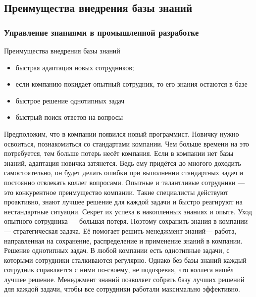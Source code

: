 \documentclass{../industrial-development}
\begin{document}
\subsection{Преимущества внедрения базы знаний}

\begin{frame} \frametitle{Управление знаниями в промышленной разработке}
  \begin{block}{Преимущества внедрения базы знаний}
  \end{block}
  
  \begin{itemize}
  \item быстрая адаптация новых сотрудников;
  \item если компанию покидает опытный сотрудник, то его знания остаются в базе
  \item быстрое решение однотипных задач
  \item быстрый поиск ответов на вопросы
  \end{itemize}
\end{frame}

\lecturenotes
Предположим, что в компании появился новый программист. Новичку нужно освоиться, познакомиться со стандартами компании. Чем больше времени на это потребуется, тем больше потерь несёт компания. Если в компании нет базы знаний, адаптация новичка затянется. Ведь ему придётся до многого доходить самостоятельно, он будет делать ошибки при выполнении стандартных задач и постоянно отвлекать коллег вопросами.
Опытные и талантливые сотрудники — это конкурентное преимущество компании. Такие специалисты действуют проактивно, знают лучшее решение для каждой задачи и быстро реагируют на нестандартные ситуации. Секрет их успеха в накопленных знаниях и опыте. Уход опытного сотрудника — большая потеря. Поэтому сохранить знания в компании — стратегическая задача. Её помогает решить менеджмент знаний— работа, направленная на сохранение, распределение и применение знаний в компании. 
Решение однотипных задач. В любой компании есть однотипные задачи, с которыми сотрудники сталкиваются регулярно. Однако без базы знаний каждый сотрудник справляется с ними по-своему, не подозревая, что коллега нашёл лучшее решение. Менеджмент знаний позволяет собрать базу лучших решений для каждой задачи, чтобы все сотрудники работали максимально эффективно. 
\end{document}
